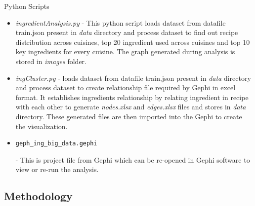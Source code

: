 \documentclass[sigconf]{acmart}
\begin{document}
Python Scripts
\begin{itemize}
\item \emph{ingredientAnalysis.py} - This python script loads dataset from datafile train.json present in \emph{data} directory and process dataset to find out recipe distribution across cuisines, top 20 ingredient used across cuisines and top 10 key ingredients for every cuisine. The graph generated during analysis is stored in \emph{images} folder.
\item \emph{ingCluster.py} - loads dataset from datafile train.json present in \emph{data} directory and process dataset to create relationship file required by Gephi in excel format. It establishes ingredients relationship by relating ingredient in recipe with each other to generate \emph{nodes.xlsx} and \emph{edges.xlsx} files and stores in \emph{data} directory. These generated files are then imported into the Gephi to create the visualization.
\item \begin{verbatim}geph_ing_big_data.gephi\end{verbatim} - This is project file from Gephi which can be re-opened in Gephi software to view or re-run the analysis.
\end{itemize}

\subsection{Methodology}
\end{document}
